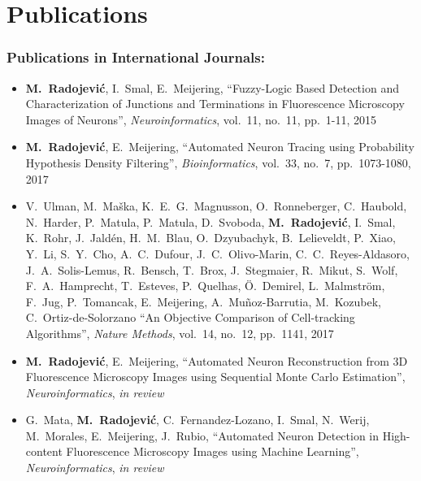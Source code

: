 %
%

\noquote
\orgchpos
\chapter*{Publications}
\label{publications}

\small
\normalsize

\subsection*{Publications in International Journals:}
\vspace{1ex}
\begin{itemize}
	\item \textbf{M.~Radojevi\'{c}}, I.~Smal, E.~Meijering, ``Fuzzy-Logic Based Detection and Characterization of Junctions and Terminations in Fluorescence Microscopy Images of Neurons'', \emph{Neuroinformatics}, vol.~11, no.~11, pp.~1-11, 2015
	
	\item \textbf{M.~Radojevi\'{c}}, E.~Meijering, ``Automated Neuron Tracing using Probability Hypothesis Density Filtering'', \emph{Bioinformatics}, vol.~33, no.~7, pp.~1073-1080, 2017
	
	\item V.~Ulman, M.~Ma\v{s}ka, K.~E.~G.~Magnusson, O.~Ronneberger, C.~Haubold, N.~Harder, P.~Matula, P.~Matula, D.~Svoboda, \textbf{M.~Radojevi\'{c}}, I.~Smal, K.~Rohr, J.~Jald\'{e}n, H.~M.~Blau, O.~Dzyubachyk, B.~Lelieveldt, P.~Xiao, Y.~Li, S.~Y.~Cho, A.~C.~Dufour,	J.~C.~Olivo-Marin, C.~C.~Reyes-Aldasoro, J.~A.~Solis-Lemus, R.~Bensch, T.~Brox, J.~Stegmaier, R.~Mikut, S.~Wolf,	F.~A.~Hamprecht, T.~Esteves, P.~Quelhas, \"{O}.~Demirel, L.~Malmstr\"{o}m, F.~Jug, P.~Tomancak, E.~Meijering, A.~Mu\~{n}oz-Barrutia, M.~Kozubek, C.~Ortiz-de-Solorzano ``An Objective Comparison of Cell-tracking Algorithms'', \emph{Nature Methods}, vol.~14, no.~12, pp.~1141, 2017
	
	\item \textbf{M.~Radojevi\'{c}}, E.~Meijering, ``Automated Neuron Reconstruction from 3D Fluorescence Microscopy Images using Sequential Monte Carlo Estimation'', \emph{Neuroinformatics}, \emph{in review}%
	
	\item G.~Mata, \textbf{M.~Radojevi\'{c}}, C.~Fernandez-Lozano, I.~Smal, N.~Werij, M.~Morales, E.~Meijering, J.~Rubio, ``Automated Neuron Detection in High-content Fluorescence Microscopy Images using Machine Learning'', \emph{Neuroinformatics}, \emph{in review}%
\end{itemize}

